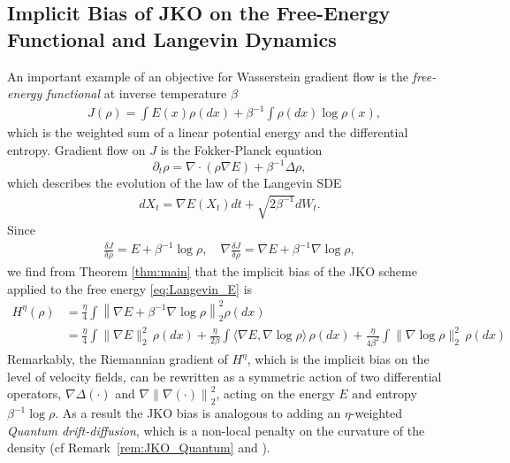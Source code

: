 \documentclass[reqno,11pt,letterpaper]{amsart}
\theoremstyle{plain}
\theoremstyle{definition}
\theoremstyle{remark}
\begin{document}
\subsection{Implicit Bias of JKO on the Free-Energy Functional and Langevin Dynamics}\label{sec:free_energy_Langevin_IB}

An important example of an  objective for Wasserstein gradient flow is the  \emph{free-energy functional} at inverse temperature $\beta$
\begin{align}\label{eq:Langevin_E}
    &J(\rho) = \int E(x)\rho(dx) + \beta^{-1} \int  \rho(dx)\log \rho(x), 
\end{align}
which is the weighted sum of a linear potential energy and the differential entropy. Gradient flow on $J$ is the 
Fokker-Planck equation 
\[
\partial_{t} \rho = \nabla \cdot (\rho \nabla E) + \beta^{-1} \Delta \rho,
\]
which describes the evolution of the law of the Langevin SDE
\begin{align}
    dX_{t} = \nabla E(X_{t}) dt + \sqrt{2\beta^{-1}} dW_{t}.
\end{align}
Since 
\begin{align}\label{eq:WGF_Langevin}
    \frac{\delta J}{\delta \rho} = E + \beta^{-1} \log \rho, \quad \nabla \frac{\delta J}{\delta \rho} = \nabla E + \beta^{-1} \nabla \log \rho,
\end{align}
we find from Theorem \ref{thm:main} that the implicit bias of the JKO scheme applied to the free energy \eqref{eq:Langevin_E} is
\begin{align*}
    H^{\eta}(\rho)&=  \frac{\eta}{4} \int \left\lVert \nabla E + \beta^{-1} \nabla \log \rho \right\rVert_{2}^{2} \rho(dx) \\
    &= \frac{\eta}{4} \int \lVert \nabla E \rVert_{2}^{2} \,\rho(dx)+ \frac{\eta}{2 \beta} \int \langle \nabla E , \nabla \log \rho \rangle \,\rho(dx)+\frac{\eta}{4 \beta^{2}}\int \lVert \nabla \log \rho \rVert_{2}^{2} \,\rho(dx) 
\end{align*}
Remarkably, the Riemannian gradient of $H^\eta$, which is the implicit bias on the level of velocity fields, can be rewritten as a symmetric action of two differential operators, $\nabla \Delta (\cdot)$ and $\nabla \left\lVert \nabla (\cdot) \right\rVert_{2}^{2}$, acting on the energy  $E$ and entropy $\beta^{-1} \log \rho$. As a result the JKO bias is analogous to adding an $\eta$-weighted \textit{Quantum drift-diffusion}, which is a non-local penalty on the curvature of the density (cf Remark~\ref{rem:JKO_Quantum} and \cite{Gianazza2008}). 
\end{document}
